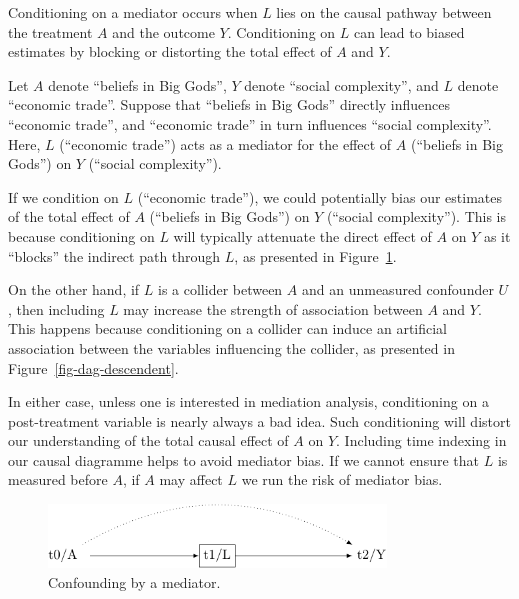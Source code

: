 \documentclass[
  singlecolumn]{report}
\begin{document}
Conditioning on a mediator occurs when \(L\) lies on the causal pathway
between the treatment \(A\) and the outcome \(Y\). Conditioning on \(L\)
can lead to biased estimates by blocking or distorting the total effect
of \(A\) and \(Y\).

Let \(A\) denote ``beliefs in Big Gods'', \(Y\) denote ``social
complexity'', and \(L\) denote ``economic trade''. Suppose that
``beliefs in Big Gods'' directly influences ``economic trade'', and
``economic trade'' in turn influences ``social complexity''. Here, \(L\)
(``economic trade'') acts as a mediator for the effect of \(A\)
(``beliefs in Big Gods'') on \(Y\) (``social complexity'').

If we condition on \(L\) (``economic trade''), we could potentially bias
our estimates of the total effect of \(A\) (``beliefs in Big Gods'') on
\(Y\) (``social complexity''). This is because conditioning on \(L\)
will typically attenuate the direct effect of \(A\) on \(Y\) as it
``blocks'' the indirect path through \(L\), as presented in
Figure~\ref{fig-dag-mediator}.

On the other hand, if \(L\) is a collider between \(A\) and an
unmeasured confounder \(U\), then including \(L\) may increase the
strength of association between \(A\) and \(Y\). This happens because
conditioning on a collider can induce an artificial association between
the variables influencing the collider, as presented in
Figure~\ref{fig-dag-descendent}.

In either case, unless one is interested in mediation analysis,
conditioning on a post-treatment variable is nearly always a bad idea.
Such conditioning will distort our understanding of the total causal
effect of \(A\) on \(Y\). Including time indexing in our causal
diagramme helps to avoid mediator bias. If we cannot ensure that \(L\)
is measured before \(A\), if \(A\) may affect \(L\) we run the risk of
mediator bias.

\begin{figure}

{\centering \includegraphics[width=0.8\textwidth,height=\textheight]{causal-dags_files/figure-pdf/fig-dag-mediator-1.pdf}

}

\caption{\label{fig-dag-mediator}Confounding by a mediator.}

\end{figure}
\end{document}
